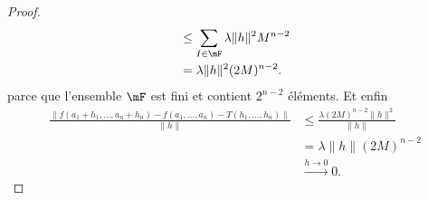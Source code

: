 \begin{proof}
\begin{subequations}
\begin{align}
			                                                                    & \leq \sum_{I\in\mF}\lambda\| h \|^2M^{n-2}             \\
			                                                                    & =\lambda \| h \|^2(2M)^{n-2}.
		\end{align}
	\end{subequations}
	parce que l'ensemble \( \mF\) est fini et contient \( 2^{n-2}\) éléments. Et enfin
	\begin{subequations}
		\begin{align}
			\frac{
				\| f(a_1+h_1,\ldots,a_n+h_n)-f(a_1,\ldots,a_n)-T(h_1,\ldots,h_n)  \|
			}{ \| h \| } & \leq\frac{ \lambda (2M)^{n-2}\| h \|^2 }{ \| h \| } \\
			             & =\lambda\| h \| (2M)^{n-2}                          \\
			             & \stackrel{ h\to 0}{\longrightarrow} 0.
		\end{align}
	\end{subequations}
\end{proof}

